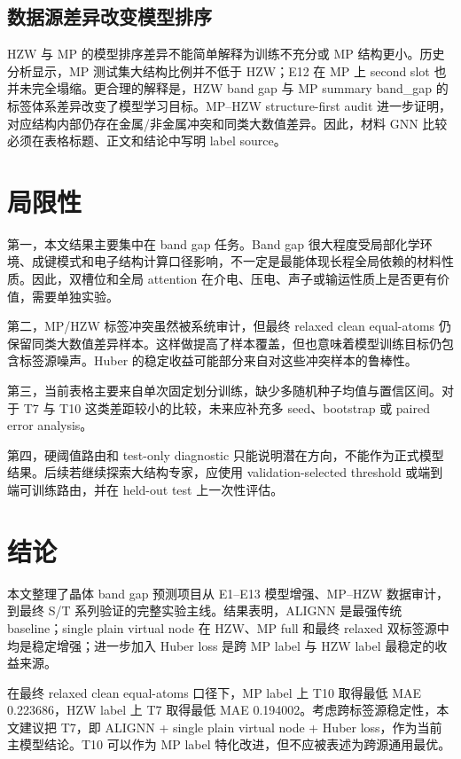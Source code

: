 \documentclass[UTF8,a4paper,11pt]{ctexart}
\begin{document}
\subsection{数据源差异改变模型排序}

HZW 与 MP 的模型排序差异不能简单解释为训练不充分或 MP 结构更小。历史分析显示，MP 测试集大结构比例并不低于 HZW；E12 在 MP 上 second slot 也并未完全塌缩。更合理的解释是，HZW band gap 与 MP summary band\_gap 的标签体系差异改变了模型学习目标。MP--HZW structure-first audit 进一步证明，对应结构内部仍存在金属/非金属冲突和同类大数值差异。因此，材料 GNN 比较必须在表格标题、正文和结论中写明 label source。

\section{局限性}

第一，本文结果主要集中在 band gap 任务。Band gap 很大程度受局部化学环境、成键模式和电子结构计算口径影响，不一定是最能体现长程全局依赖的材料性质。因此，双槽位和全局 attention 在介电、压电、声子或输运性质上是否更有价值，需要单独实验。

第二，MP/HZW 标签冲突虽然被系统审计，但最终 relaxed clean equal-atoms 仍保留同类大数值差异样本。这样做提高了样本覆盖，但也意味着模型训练目标仍包含标签源噪声。Huber 的稳定收益可能部分来自对这些冲突样本的鲁棒性。

第三，当前表格主要来自单次固定划分训练，缺少多随机种子均值与置信区间。对于 T7 与 T10 这类差距较小的比较，未来应补充多 seed、bootstrap 或 paired error analysis。

第四，硬阈值路由和 test-only diagnostic 只能说明潜在方向，不能作为正式模型结果。后续若继续探索大结构专家，应使用 validation-selected threshold 或端到端可训练路由，并在 held-out test 上一次性评估。

\section{结论}

本文整理了晶体 band gap 预测项目从 E1--E13 模型增强、MP--HZW 数据审计，到最终 S/T 系列验证的完整实验主线。结果表明，ALIGNN 是最强传统 baseline；single plain virtual node 在 HZW、MP full 和最终 relaxed 双标签源中均是稳定增强；进一步加入 Huber loss 是跨 MP label 与 HZW label 最稳定的收益来源。

在最终 relaxed clean equal-atoms 口径下，MP label 上 T10 取得最低 MAE 0.223686，HZW label 上 T7 取得最低 MAE 0.194002。考虑跨标签源稳定性，本文建议把 T7，即 ALIGNN + single plain virtual node + Huber loss，作为当前主模型结论。T10 可以作为 MP label 特化改进，但不应被表述为跨源通用最优。
\end{document}
